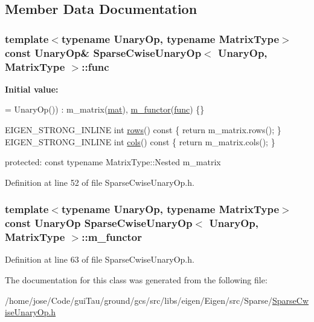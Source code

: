 \subsection{Member Data Documentation}
\hypertarget{class_sparse_cwise_unary_op_a635c598c7b4afd3cffcb6ab5046a3c5c}{
\subsubsection[{func}]{\setlength{\rightskip}{0pt plus 5cm}template$<$typename Unary\-Op, typename Matrix\-Type$>$ const Unary\-Op\& {\bf Sparse\-Cwise\-Unary\-Op}$<$ Unary\-Op, Matrix\-Type $>$\-::func}}\label{class_sparse_cwise_unary_op_a635c598c7b4afd3cffcb6ab5046a3c5c}
{\bfseries Initial value\-:}
\begin{DoxyCode}
= UnaryOp())
      : m\_matrix(\hyperlink{uavobjecttemplate_8m_a16a51e808b16c46bbfd36da2e37cd123}{mat}), \hyperlink{class_sparse_cwise_unary_op_aad7e9874474acb12011e14c295432def}{m\_functor}(\hyperlink{class_sparse_cwise_unary_op_a635c598c7b4afd3cffcb6ab5046a3c5c}{func}) \{\}

    EIGEN\_STRONG\_INLINE \textcolor{keywordtype}{int} \hyperlink{class_sparse_matrix_base_a31cbd85da1aa1e42714faec11a2bd547}{rows}()\textcolor{keyword}{ const }\{ \textcolor{keywordflow}{return} m\_matrix.rows(); \}
    EIGEN\_STRONG\_INLINE \textcolor{keywordtype}{int} \hyperlink{class_sparse_matrix_base_a4fcec997e794a92e143622992a4557cc}{cols}()\textcolor{keyword}{ const }\{ \textcolor{keywordflow}{return} m\_matrix.cols(); \}




  \textcolor{keyword}{protected}:
    \textcolor{keyword}{const} \textcolor{keyword}{typename} MatrixType::Nested m\_matrix
\end{DoxyCode}


Definition at line 52 of file Sparse\-Cwise\-Unary\-Op.\-h.

\hypertarget{class_sparse_cwise_unary_op_aad7e9874474acb12011e14c295432def}{
\subsubsection[{m\-\_\-functor}]{\setlength{\rightskip}{0pt plus 5cm}template$<$typename Unary\-Op, typename Matrix\-Type$>$ const Unary\-Op {\bf Sparse\-Cwise\-Unary\-Op}$<$ Unary\-Op, Matrix\-Type $>$\-::m\-\_\-functor}}\label{class_sparse_cwise_unary_op_aad7e9874474acb12011e14c295432def}


Definition at line 63 of file Sparse\-Cwise\-Unary\-Op.\-h.



The documentation for this class was generated from the following file\-:\begin{DoxyCompactItemize}
\item 
/home/jose/\-Code/gui\-Tau/ground/gcs/src/libs/eigen/\-Eigen/src/\-Sparse/\hyperlink{_sparse_cwise_unary_op_8h}{Sparse\-Cwise\-Unary\-Op.\-h}\end{DoxyCompactItemize}
